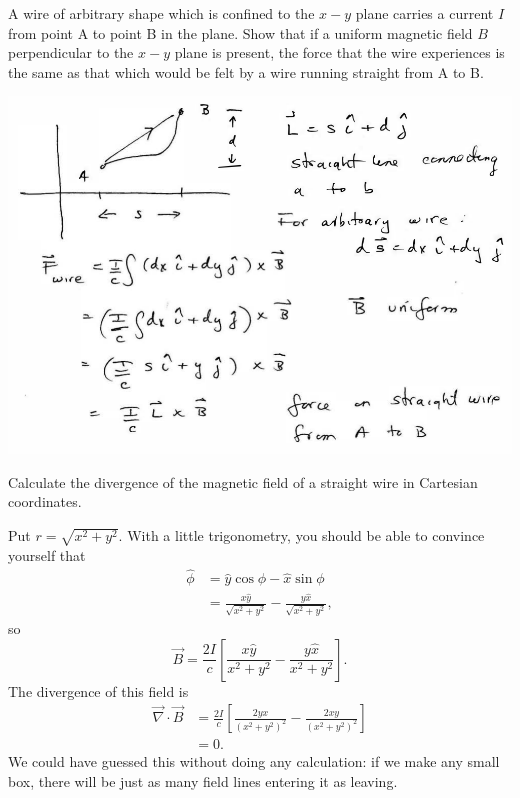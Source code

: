 \documentclass{esg8022pset}
\begin{document}
\begin{problem}{}
  A wire of arbitrary shape which is confined to the $x-y$ plane carries a current $I$ from point A to point B in the plane. Show that if a uniform magnetic field $B$ perpendicular to the $x-y$ plane is present, the force that the wire experiences is the same as that which would be felt by a wire running straight from A to B.
\end{problem}
\begin{solution}
  \begin{center}\includegraphics{ps07_sol_04_1.pdf}\end{center}
\end{solution}





\begin{problem}{}
  Calculate the divergence of the magnetic field of a straight wire in Cartesian coordinates.
\end{problem}
\begin{solution}
  Put $r = \sqrt{x^2 + y^2}$.  With a little trigonometry, you should be able to convince yourself that 
  \begin{align*}
    \hat\phi & = \hat y \cos\phi - \hat x\sin\phi \\
      & = \frac{x\hat y}{\sqrt{x^2 + y^2}} - \frac{y\hat x}{\sqrt{x^2 + y^2}},
  \end{align*}
  so
  $$\vec B = \frac{2I}{c}\left[\frac{x\hat y}{x^2 + y^2} - \frac{y\hat x}{x^2 + y^2}\right].$$
  The divergence of this field is
  \begin{align*}
    \vec\nabla \cdot \vec B & = \frac{2I}{c}\left[\frac{2yx}{(x^2 + y^2)^2} - \frac{2xy}{(x^2 + y^2)^2}\right] \\
      & = 0.
  \end{align*}
  We could have guessed this without doing any calculation: if we make any small box, there will be just as many field lines entering it as leaving.
\end{solution}
\end{document}
